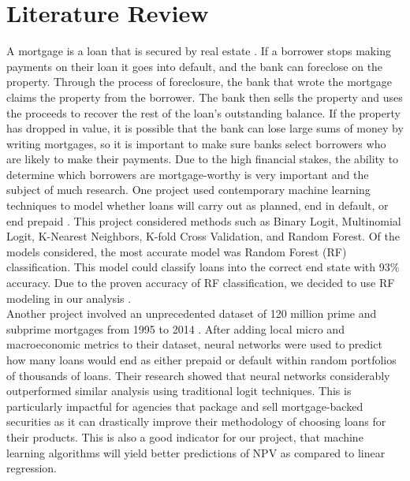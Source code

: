 \documentclass[12 pt]{uncw_thesis}
\theoremstyle{plain}
\theoremstyle{remark}
\theoremstyle{definition}
\begin{document}
\section{Literature Review}
A mortgage is a loan that is secured by real estate \cite{Fannie}. If a borrower stops making payments on their loan it goes into default, and the bank can foreclose on the property. Through the process of foreclosure, the bank  that  wrote the mortgage claims the property from the borrower. The bank then sells the property and uses the proceeds to recover the rest of the loan's outstanding balance. If the property has dropped in value, it is possible that the bank can lose large sums of money by writing mortgages, so it is important to make sure banks select borrowers who are likely to make their payments. Due to the high financial stakes, the ability to determine which borrowers are mortgage-worthy is very important and the subject of much research. One project used contemporary machine learning techniques to model whether loans will carry out as planned, end in default, or end prepaid \cite{Deng}. This project considered methods such as Binary Logit, Multinomial Logit, K-Nearest Neighbors, K-fold Cross Validation, and Random Forest. Of the models considered, the most accurate model was Random Forest (RF) classification. This model could classify loans into the correct end state with 93\% accuracy. Due to the proven accuracy of RF classification, we decided to use RF modeling in our analysis \cite{Deng}. \\ 
Another project involved an unprecedented dataset of 120 million prime and subprime mortgages from 1995 to 2014 \cite{Sirignano}. After adding local micro and macroeconomic metrics to their dataset, neural networks were used to predict how many loans would end as either prepaid or default within random portfolios of thousands of loans. Their research showed that neural networks considerably outperformed similar analysis using traditional logit techniques. This is particularly impactful for agencies that package and sell mortgage-backed securities as it can drastically improve their methodology of choosing loans for their products. This is also a good indicator for our project, that machine learning algorithms will yield better predictions of NPV as compared to linear regression.
\end{document}
